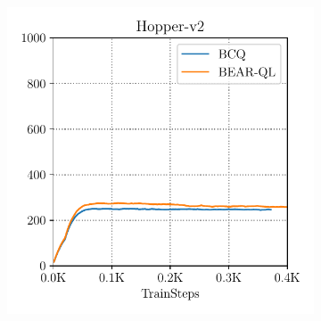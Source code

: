 \label{app:q_val_compare}
\begin{figure}[h]
    \centering
    \begin{subfigure}[h]{0.31\textwidth}
        \centering
        \includegraphics[width=0.99\linewidth]{chapters/bear/images/hopper_mediocre_q_val.pdf}
    \end{subfigure}%
    ~
    \begin{subfigure}[h]{0.31\textwidth}
        \centering

\end{subfigure}
\end{figure}
